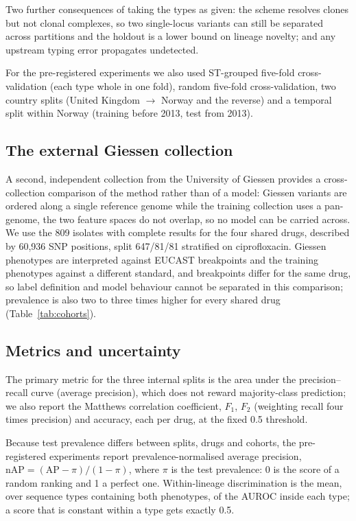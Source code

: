 Two further consequences of taking the types as given: the scheme resolves clones but not clonal
complexes, so two single-locus variants can still be separated across partitions and the holdout is
a lower bound on lineage novelty; and any upstream typing error propagates undetected.

For the pre-registered experiments we also used ST-grouped five-fold cross-validation (each type
whole in one fold), random five-fold cross-validation, two country splits (United
Kingdom $\rightarrow$ Norway and the reverse) and a temporal split within Norway (training before
2013, test from 2013).

\subsection*{The external Giessen collection}
A second, independent \Ecoli{} collection from the University of Giessen \cite{ren2022giessen}
provides a cross-collection comparison of the method rather than of a model: Giessen variants are
ordered along a single reference genome while the training collection uses a pan-genome, the two
feature spaces do not overlap, so no model can be carried across. We use the 809 isolates with
complete results for the four shared drugs, described by 60,936 SNP positions, split 647/81/81
stratified on ciprofloxacin. Giessen phenotypes are interpreted against EUCAST breakpoints and the
training phenotypes against a different standard, and breakpoints differ for the same drug, so
label definition and model behaviour cannot be separated in this comparison; prevalence is also two
to three times higher for every shared drug (Table~\ref{tab:cohorts}).

\subsection*{Metrics and uncertainty}
The primary metric for the three internal splits is the area under the precision--recall curve
(average precision), which does not reward majority-class prediction; we also report the Matthews
correlation coefficient, $F_1$, $F_2$ (weighting recall four times precision) and accuracy, each
per drug, at the fixed 0.5 threshold.

Because test prevalence differs between splits, drugs and cohorts, the pre-registered experiments
report prevalence-normalised average precision, $\mathrm{nAP} = (\mathrm{AP} - \pi)/(1 - \pi)$,
where $\pi$ is the test prevalence: 0 is the score of a random ranking and 1 a perfect one.
Within-lineage discrimination is the mean, over sequence types containing both phenotypes, of the
AUROC inside each type; a score that is constant within a type gets exactly 0.5.

